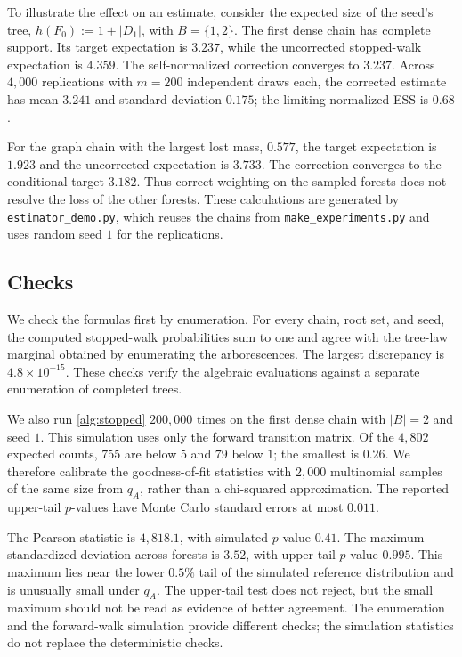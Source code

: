 \documentclass[onefignum,onetabnum]{siamart250211}
\numberwithin{theorem}{section}
\numberwithin{equation}{section}
\begin{document}
To illustrate the effect on an estimate, consider the expected size
of the seed's tree, $h(F_0):=1+|D_1|$, with $B=\{1,2\}$.
The first dense chain has complete support. Its target expectation
is $3.237$, while the uncorrected stopped-walk expectation is $4.359$.
The self-normalized correction converges to $3.237$. Across
$4{,}000$ replications with $m=200$ independent draws each, the
corrected estimate has mean $3.241$ and standard deviation $0.175$;
the limiting normalized ESS is $0.68$.

For the graph chain with the largest lost mass, $0.577$, the target
expectation is $1.923$ and the uncorrected expectation is $3.733$.
The correction converges to the conditional target $3.182$. Thus
correct weighting on the sampled forests does not resolve the loss
of the other forests. These calculations are generated by
\nolinkurl{estimator_demo.py}, which reuses the chains from
\nolinkurl{make_experiments.py} and uses random seed $1$ for the
replications.

\subsection{Checks}
We check the formulas first by enumeration. For every chain, root
set, and seed, the computed stopped-walk probabilities sum to one
and agree with the tree-law marginal obtained by enumerating the
arborescences. The largest discrepancy is $4.8\times10^{-15}$.
These checks verify the algebraic evaluations against a separate
enumeration of completed trees.

We also run \cref{alg:stopped} $200{,}000$ times on the first dense
chain with $|B|=2$ and seed $1$. This simulation uses only the forward
transition matrix. Of the $4{,}802$ expected counts, $755$ are below
$5$ and $79$ below $1$; the smallest is $0.26$. We therefore calibrate
the goodness-of-fit statistics with $2{,}000$ multinomial samples of
the same size from $q_A$, rather than a chi-squared approximation.
The reported upper-tail $p$-values have Monte Carlo standard errors
at most $0.011$.

The Pearson statistic is $4{,}818.1$, with simulated $p$-value $0.41$.
The maximum standardized deviation across forests is $3.52$, with
upper-tail $p$-value $0.995$. This maximum lies near the lower
$0.5\%$ tail of the simulated reference distribution and is unusually
small under $q_A$. The upper-tail test does not reject, but the small
maximum should not be read as evidence of better agreement. The
enumeration and the forward-walk simulation provide different checks;
the simulation statistics do not replace the deterministic checks.



\end{document}
